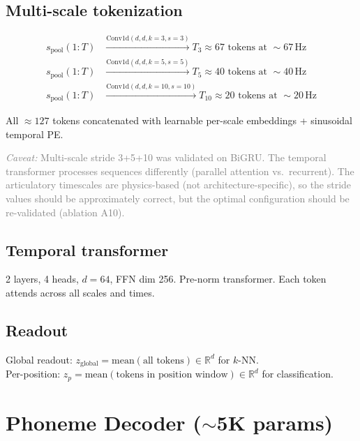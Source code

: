\documentclass[11pt,letterpaper]{article}
\newcommand{\caveat}[1]{\par\smallskip\noindent\textcolor{gray}{\textit{Caveat:} #1}\smallskip}
\newcommand{\R}{\mathbb{R}}
\begin{document}
\subsection{Multi-scale tokenization}

\begin{equation}
\begin{aligned}
s_{\text{pool}}(1{:}T) &\xrightarrow{\text{Conv1d}(d,d,k{=}3,s{=}3)} T_3 \approx 67 \text{ tokens at } {\sim}67\,\text{Hz}\\
s_{\text{pool}}(1{:}T) &\xrightarrow{\text{Conv1d}(d,d,k{=}5,s{=}5)} T_5 \approx 40 \text{ tokens at } {\sim}40\,\text{Hz}\\
s_{\text{pool}}(1{:}T) &\xrightarrow{\text{Conv1d}(d,d,k{=}10,s{=}10)} T_{10} \approx 20 \text{ tokens at } {\sim}20\,\text{Hz}
\end{aligned}
\end{equation}

All ${\approx}127$ tokens concatenated with learnable per-scale embeddings + sinusoidal temporal PE.

\caveat{Multi-scale stride 3+5+10 was validated on BiGRU. The temporal transformer processes sequences differently (parallel attention vs.\ recurrent). The articulatory timescales are physics-based (not architecture-specific), so the stride values should be approximately correct, but the optimal configuration should be re-validated (ablation A10).}

\subsection{Temporal transformer}

2 layers, 4 heads, $d{=}64$, FFN dim 256. Pre-norm transformer. Each token attends across all scales and times.

\subsection{Readout}

Global readout: $z_{\text{global}} = \text{mean}(\text{all tokens}) \in \R^d$ for $k$-NN.\\
Per-position: $z_p = \text{mean}(\text{tokens in position window}) \in \R^d$ for classification.


\section{Phoneme Decoder (\texorpdfstring{${\sim}$5K}{~5K} params)}
\end{document}
